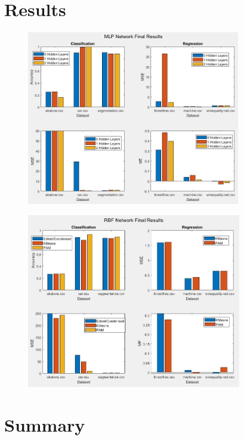 \documentclass[twoside,11pt]{article}
\begin{document}
\section{Results}
\begin{figure}[h]
	\centering
	\includegraphics[height=3in]{FINAL_FIGS/MLP_FINAL.JPG}
\end{figure}
\begin{figure}[h]
	\centering
	\includegraphics[height=3in]{FINAL_FIGS/RBF_FINAL.JPG}
\end{figure}
\section{Summary}



\end{document}
